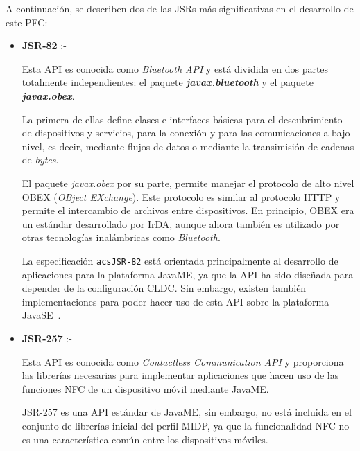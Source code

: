 A continuación, se describen dos de las \acs{JSR}s más significativas
en el desarrollo de este \acs{PFC}:

\begin{itemize}
\item \textbf{\acs{JSR}-82} :- %

Esta \acs{API} es conocida como \emph{Bluetooth \acs{API}} y está dividida en
dos partes totalmente independientes: el paquete
\emph{\textbf{javax.bluetooth}} y el paquete \emph{\textbf{javax.obex}}.

La primera de ellas define clases e interfaces básicas para el descubrimiento
de dispositivos y servicios, para la conexión y para las comunicaciones a bajo 
nivel, es decir, mediante flujos de datos o mediante la transimisión de cadenas
de \emph{bytes}.

El paquete \emph{javax.obex} por su parte, permite manejar el protocolo de
alto nivel \acs{OBEX} (\emph{OBject EXchange}). Este protocolo es similar
al protocolo \acs{HTTP} y permite el intercambio de archivos entre
dispositivos. En principio, \acs{OBEX} era un estándar desarrollado por
\acs{IrDA}, aunque ahora también es utilizado por otras tecnologías
inalámbricas como \emph{Bluetooth}.

La especificación \texttt{acs{JSR}-82} está orientada principalmente al 
desarrollo de aplicaciones para la plataforma \acs{JavaME}, ya que la \acs{API} 
ha sido diseñada para depender de la configuración \acs{CLDC}. Sin embargo, 
existen también implementaciones para poder hacer uso de esta \acs{API} sobre
la plataforma \acs{JavaSE}~\cite{bib:jsr82}.

\item \textbf{\acs{JSR}-257} :- %

Esta \acs{API} es conocida como \emph{Contactless Communication \acs{API}} y
proporciona las librerías necesarias para implementar aplicaciones que
hacen uso de las funciones \acs{NFC} de un dispositivo móvil mediante
\acs{JavaME}.

\acs{JSR}-257 es una \acs{API} estándar de \acs{JavaME}, sin embargo, no
está incluida en el conjunto de librerías inicial del perfil \acs{MIDP}, ya
que la funcionalidad \acs{NFC} no es una característica común entre los
dispositivos móviles.


\end{itemize}
